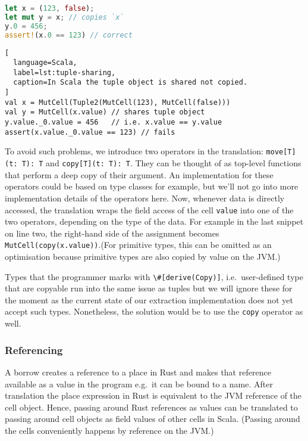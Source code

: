 \begin{lstlisting}[language=Rust, caption=The tuple is copied on line 2.]
let x = (123, false);
let mut y = x; // copies `x`
y.0 = 456;
assert!(x.0 == 123) // correct
\end{lstlisting}

\begin{lstlisting}[
  language=Scala,
  label=lst:tuple-sharing,
  caption=In Scala the tuple object is shared not copied.
]
val x = MutCell(Tuple2(MutCell(123), MutCell(false)))
val y = MutCell(x.value) // shares tuple object
y.value._0.value = 456   // i.e. x.value == y.value
assert(x.value._0.value == 123) // fails
\end{lstlisting}

To avoid such problems, we introduce two operators in the translation:
\passthrough{\lstinline!move[T](t: T): T!} and
\passthrough{\lstinline!copy[T](t: T): T!}. They can be thought of as
top-level functions that perform a deep copy of their argument. An
implementation for these operators could be based on type classes for
example, but we'll not go into more implementation details of the
operators here. Now, whenever data is directly accessed, the translation
wraps the field access of the cell \passthrough{\lstinline!value!} into
one of the two operators, depending on the type of the data. For example
in the last snippet on line two, the right-hand side of the assignment
becomes \lstinline!MutCell(copy(x.value))!.(For primitive
types, this can be omitted as an optimisation because primitive types
are also copied by value on the JVM.)

Types that the programmer marks with \lstinline!\#[derive(Copy)]!,
i.e.~user-defined type that are copyable run into the same issue as tuples but
we will ignore these for the moment as the current state of our extraction
implementation does not yet accept such types. Nonetheless, the solution would
be to use the \passthrough{\lstinline!copy!} operator as well.

\subsubsection{Referencing}

A borrow creates a reference to a place in Rust and makes that reference
available as a value in the program e.g.~it can be bound to a name.
After translation the place expression in Rust is equivalent to the JVM
reference of the cell object. Hence, passing around Rust references as
values can be translated to passing around cell objects as field values
of other cells in Scala. (Passing around the cells conveniently happens
by reference on the JVM.)

